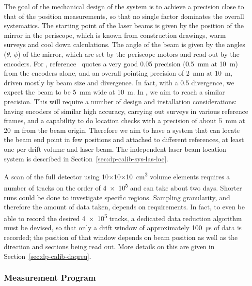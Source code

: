 The goal of the mechanical design of the system is to achieve a precision close to that of the  position measurements, so that no single factor dominates %
the overall systematics. The starting point of the laser beams is given by the position of the mirror in the periscope, which is known from construction drawings, warm surveys and cool down calculations. The angle of the beam is given by the angles ($\theta$, $\phi$) of the mirror, which are set by the periscope motors and read out by the encoders. 
For , reference~\cite{bib:chen2018} quotes a very good \SI{0.05}{\mrad} precision (\SI{0.5}{\milli\m} at \SI{10}{\m}) from the encoders alone, and an overall pointing precision of \SI{2}{\milli\m} at \SI{10}{\m}, driven mostly by beam size and divergence. In fact, with a \SI{0.5}{\mrad} divergence, we expect the beam to be \SI{5}{\milli\m} wide at \SI{10}{\m}.
In , we aim to reach a similar precision. This will require a number of design and installation considerations: having encoders of similar high accuracy, carrying out surveys in various reference frames, and a capability to do location checks with a precision of about \SI{5}{\milli\m}  at \SI{20}{\m} from the beam origin. Therefore we aim to have a system that can locate the beam end point in few positions and attached to different references, at least one per drift volume and laser beam. The independent laser beam location system is described in Section~\ref{sec:dp-calib-sys-las-loc}. 

A scan of the full detector using \num{10}$\times$\num{10}$\times$\SI{10}{\cubic\cm} volume elements requires a number of tracks on the order of \num{4e5} and can take about two days. Shorter runs could be done to investigate specific regions. Sampling granularity, and therefore the amount of data taken, depends on  requirements. In fact, to even be able to record the desired \num{4e5} tracks, a dedicated data reduction algorithm must be devised, so that only a drift window of approximately \SI{100}{\micro\s}
of data is recorded; the position of that window depends on beam position as well as the direction and  sections being read out. More details on this are given in Section~\ref{sec:dp-calib-daqreq}.



\subsubsection{Measurement Program}
\label{sec:dp-calib-sys-las-ion-meas}

